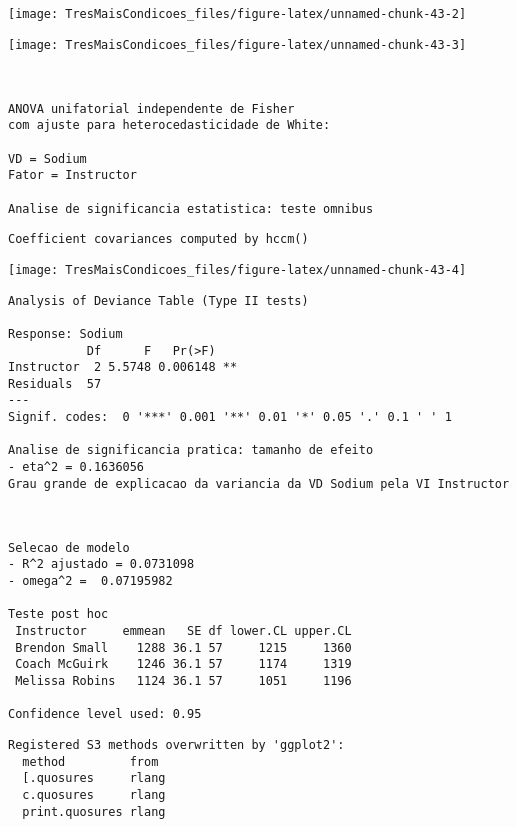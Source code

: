 \documentclass[]{article}
\begin{document}
\begin{center}\texttt{[image: TresMaisCondicoes\_files/figure-latex/unnamed-chunk-43-2]} \end{center}

\begin{center}\texttt{[image: TresMaisCondicoes\_files/figure-latex/unnamed-chunk-43-3]} \end{center}

\begin{verbatim}


ANOVA unifatorial independente de Fisher 
com ajuste para heterocedasticidade de White:

VD = Sodium 
Fator = Instructor 

Analise de significancia estatistica: teste omnibus
\end{verbatim}

\begin{verbatim}
Coefficient covariances computed by hccm()
\end{verbatim}

\begin{center}\texttt{[image: TresMaisCondicoes\_files/figure-latex/unnamed-chunk-43-4]} \end{center}

\begin{verbatim}
Analysis of Deviance Table (Type II tests)

Response: Sodium
           Df      F   Pr(>F)   
Instructor  2 5.5748 0.006148 **
Residuals  57                   
---
Signif. codes:  0 '***' 0.001 '**' 0.01 '*' 0.05 '.' 0.1 ' ' 1

Analise de significancia pratica: tamanho de efeito
- eta^2 = 0.1636056 
Grau grande de explicacao da variancia da VD Sodium pela VI Instructor 
\end{verbatim}

\begin{verbatim}


Selecao de modelo
- R^2 ajustado = 0.0731098 
- omega^2 =  0.07195982 

Teste post hoc
 Instructor     emmean   SE df lower.CL upper.CL
 Brendon Small    1288 36.1 57     1215     1360
 Coach McGuirk    1246 36.1 57     1174     1319
 Melissa Robins   1124 36.1 57     1051     1196

Confidence level used: 0.95 
\end{verbatim}

\begin{verbatim}
Registered S3 methods overwritten by 'ggplot2':
  method         from 
  [.quosures     rlang
  c.quosures     rlang
  print.quosures rlang
\end{verbatim}
\end{document}
